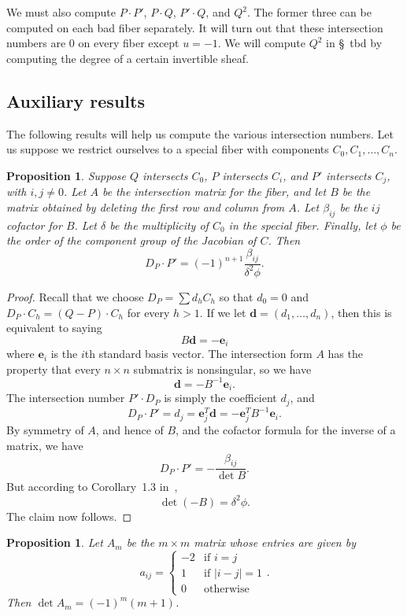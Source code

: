 \documentclass[reqno]{amsart}
\newtheorem{proposition}[thm]{Proposition}
\theoremstyle{definition}
\theoremstyle{remark}
\newcommand{\vd}{\mathbf{d}}
\newcommand{\ve}{\mathbf{e}}
\begin{document}
We must also compute $P \cdot P'$, $P \cdot Q$, $P' \cdot Q$, and $Q^2$. The former three can be computed on each bad fiber separately. It will turn out that these intersection numbers are 0 on every fiber except $u = -1$. We will compute $Q^2$ in \S~tbd by computing the degree of a certain invertible sheaf.


\subsection{Auxiliary results}
\label{sec:auxiliary-results}

The following results will help us compute the various intersection numbers. Let us suppose we restrict ourselves to a special fiber with components $C_0, C_1, \dots, C_n$.

\begin{proposition}\label{prop:dp-dot-p-cofactor}
  Suppose $Q$ intersects $C_0$, $P$ intersects $C_i$, and $P'$ intersects $C_j$, with $i,j \neq 0$. Let $A$ be the intersection matrix for the fiber, and let $B$ be the matrix obtained by deleting the first row and column from $A$. Let $\beta_{ij}$ be the $ij$ cofactor for $B$. Let $\delta$ be the multiplicity of $C_0$ in the special fiber. Finally, let $\phi$ be the order of the component group of the Jacobian of $C$. Then
  \[
  D_P \cdot P' = (-1)^{n+1} \frac{\beta_{ij}}{\delta^2 \phi}.
  \]
\end{proposition}

\begin{proof}
  Recall that we choose $D_P = \sum d_h C_h$ so that $d_0 = 0$ and $D_P \cdot C_h = (Q - P) \cdot C_h$ for every $h > 1$. If we let $\vd = (d_1, \dots, d_n)$, then this is equivalent to saying
  \[
  B\vd = -\ve_i
  \]
  where $\ve_i$ is the $i$th standard basis vector. The intersection form $A$ has the property that every $n \times n$ submatrix is nonsingular, so we have
  \[
  \vd = -B^{-1}\ve_i.
  \]
  The intersection number $P' \cdot D_P$ is simply the coefficient $d_j$, and
  \[
  D_P \cdot P' = d_j = \ve_j^T \vd = -\ve_j^TB^{-1}\ve_i.
  \]
  By symmetry of $A$, and hence of $B$, and the cofactor formula for the inverse of a matrix, we have
  \[
  D_P \cdot P' = - \frac{\beta_{ij}}{\det B}.
  \]
  But according to Corollary~1.3 in~\cite{lorenzini},
  \[
  \det (-B) = \delta^2 \phi.
  \]
  The claim now follows.
\end{proof}

\begin{proposition}\label{prop:am-defn-det}
  Let $A_m$ be the $m \times m$ matrix whose entries are given by
  \[
  a_{ij} = \begin{cases}
    -2 & \text{if } i = j \\
    1 & \text{if } |i - j| = 1\\
    0 & \text{otherwise}
  \end{cases}.
  \]
  Then $\det A_m = (-1)^m (m+1)$.
\end{proposition}
\end{document}
